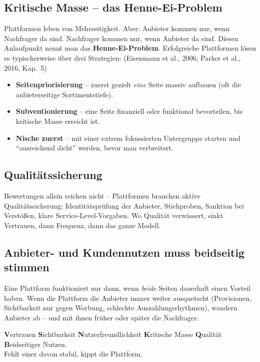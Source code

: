 \documentclass[11pt,a4paper,oneside]{article}
\newcommand{\fachbegriff}[1]{\textbf{#1}}
\newcommand{\quelle}[1]{{\footnotesize\color{lpGray}(#1)}}
\begin{document}
\subsection{Kritische Masse -- das Henne-Ei-Problem}

Plattformen leben von Mehrseitigkeit. Aber: Anbieter kommen nur, wenn Nachfrager da sind. Nachfrager kommen nur, wenn Anbieter da sind. Diesen Anlaufpunkt nennt man das \fachbegriff{Henne-Ei-Problem}. Erfolgreiche Plattformen lösen es typischerweise über drei Strategien: \quelle{Eisenmann et al., 2006; Parker et al., 2016, Kap.~5}

\begin{itemize}
  \item \textbf{Seitenpriorisierung} -- zuerst gezielt \emph{eine} Seite massiv aufbauen (oft die anbieterseitige Sortimentstiefe).
  \item \textbf{Subventionierung} -- eine Seite finanziell oder funktional bevorteilen, bis kritische Masse erreicht ist.
  \item \textbf{Nische zuerst} -- mit einer extrem fokussierten Untergruppe starten und ``ausreichend dicht'' werden, bevor man verbreitert.
\end{itemize}

\subsection{Qualitätssicherung}

Bewertungen allein reichen nicht -- Plattformen brauchen aktive Qualitätssicherung: Identitätsprüfung der Anbieter, Stichproben, Sanktion bei Verstößen, klare Service-Level-Vorgaben. Wo Qualität verwässert, sinkt Vertrauen, dann Frequenz, dann das ganze Modell.

\subsection{Anbieter- und Kundennutzen muss beidseitig stimmen}

Eine Plattform funktioniert nur dann, wenn \emph{beide} Seiten dauerhaft einen Vorteil haben. Wenn die Plattform die Anbieter immer weiter ausquetscht (Provisionen, Sichtbarkeit nur gegen Werbung, schlechte Auszahlungsrhythmen), wandern Anbieter ab -- und mit ihnen früher oder später die Nachfrager.

\begin{merkbox}
\textbf{V}ertrauen \textperiodcentered{} \textbf{S}ichtbarkeit \textperiodcentered{} \textbf{N}utzerfreundlichkeit \textperiodcentered{} \textbf{K}ritische Masse \textperiodcentered{} \textbf{Q}ualität \textperiodcentered{} \textbf{B}eidseitiger Nutzen.\\[2pt]
Fehlt einer davon stabil, kippt die Plattform.
\end{merkbox}
\end{document}
